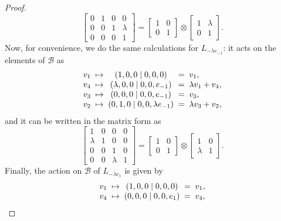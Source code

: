 \begin{proof}
\begin{equation*}
\begin{bmatrix}
			0 & 1 & 0 & 0 \\
			0 & 0 & 1 & \lambda \\
			0 & 0 & 0 & 1
		\end{bmatrix} = 
		\begin{bmatrix}
			1 & 0 \\
			0 & 1
		\end{bmatrix} \otimes
		\begin{bmatrix}
			1 & \lambda \\
			0 & 1 
		\end{bmatrix}. 
	\end{equation*}
	Now, for convenience, we do the same calculations for 
	$L_{ -\lambda e_{-1}}$: it acts on the elements
	of $\mathcal{B}$ as
	\begin{equation*}
		\begin{array}{r@{\;\;}c@{\;\;}c@{\;\;}c@{\;\;}l}
			v_1 & \mapsto & (1,0,0 \mid 0,0,0) & = & v_1, \\
			v_4 & \mapsto & (\lambda,0,0 \mid 0,0,e_{-1}) & = & \lambda v_1 + v_4, \\
			v_3 & \mapsto & (0,0,0 \mid 0,0,e_{-1}) & = & v_3, \\
			v_2 & \mapsto & (0,1,0 \mid 0,0,\lambda e_{-1}) & = & \lambda v_3 + v_2,
		\end{array}
	\end{equation*}
	and it can be written in the matrix form as
	\begin{equation*}
		\begin{bmatrix}
			1 & 0 & 0 & 0 \\
			\lambda & 1 & 0 & 0 \\
			0 & 0 & 1 & 0 \\
			0 & 0 & \lambda & 1
		\end{bmatrix} = 
		\begin{bmatrix}
			1 & 0 \\
			0 & 1
		\end{bmatrix} \otimes
		\begin{bmatrix}
			1 & 0 \\
			\lambda & 1
		\end{bmatrix}.
	\end{equation*}
	Finally, the action on $\mathcal{B}$ of $L_{-\lambda e_1}$ is given by
	\begin{equation*}
		\begin{array}{r@{\;\;}c@{\;\;}c@{\;\;}c@{\;\;}l}
			v_1 & \mapsto & (1,0,0 \mid 0,0,0) & = & v_1, \\
			v_4 & \mapsto & (0,0,0 \mid 0,0,e_1) & = & v_4, \\

\end{array}
\end{equation*}
\end{proof}
